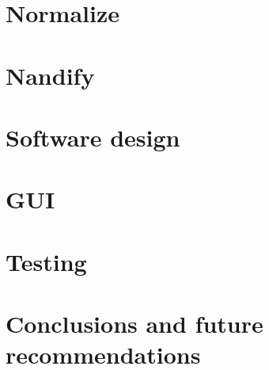 \documentclass[a4paper,10pt,twoside]{report}
\begin{document}
\clearemptydoublepage

\chapter{Normalize}\label{chapter:normalize}


\chapter{Nandify}\label{chapter:nandify}


\clearemptydoublepage

\chapter{Software design}\label{chapter:software_design}


\clearemptydoublepage

\chapter{GUI}\label{chapter:gui}


\clearemptydoublepage

\chapter{Testing}\label{chapter:testing}


\clearemptydoublepage

\chapter{Conclusions and future recommendations}\label{chapter:conclusions}


\clearemptydoublepage

%





% 
\end{document}
